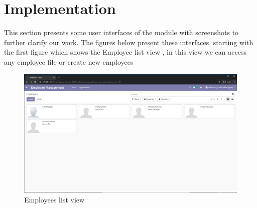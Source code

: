 \section{Implementation}
This section presents some user interfaces of the module with screenshots to further clarify our work. The figures below present these interfaces, starting with the first figure which shows the Employee list view , in this view we can access any employee file or create new employees

\begin{figure}[H]
    \centering
    \includegraphics[scale=0.38]{img/c_employees.png}
    \caption{Employees list view}
    \label{fig:my_label}
\end{figure}

